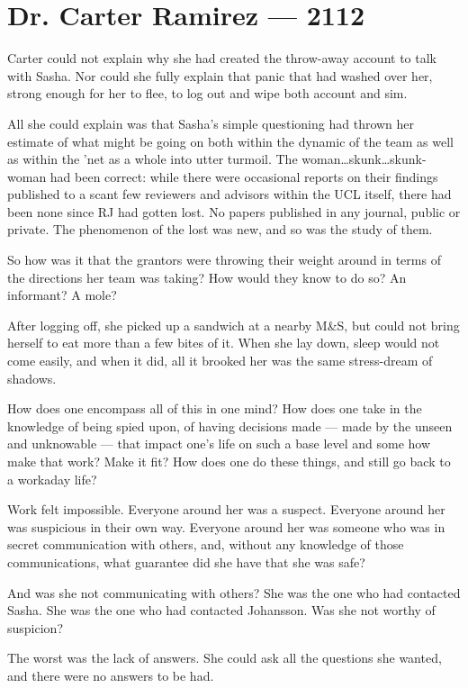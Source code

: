 \hypertarget{dr-carter-ramirez-2112}{%
\chapter*{Dr. Carter Ramirez — 2112}\label{dr-carter-ramirez-2112}}

Carter could not explain why she had created the throw-away account to talk with Sasha. Nor could she fully explain that panic that had washed over her, strong enough for her to flee, to log out and wipe both account and sim.

All she could explain was that Sasha's simple questioning had thrown her estimate of what might be going on both within the dynamic of the team as well as within the 'net as a whole into utter turmoil. The woman\ldots{}skunk\ldots{}skunk-woman had been correct: while there were occasional reports on their findings published to a scant few reviewers and advisors within the UCL itself, there had been none since RJ had gotten lost. No papers published in any journal, public or private. The phenomenon of the lost was new, and so was the study of them.

So how was it that the grantors were throwing their weight around in terms of the directions her team was taking? How would they know to do so? An informant? A mole?

After logging off, she picked up a sandwich at a nearby M\&S, but could not bring herself to eat more than a few bites of it. When she lay down, sleep would not come easily, and when it did, all it brooked her was the same stress-dream of shadows.\pagebreak

How does one encompass all of this in one mind? How does one take in the knowledge of being spied upon, of having decisions made — made by the unseen and unknowable — that impact one's life on such a base level and some how make that work? Make it fit? How does one do these things, and still go back to a workaday life?

Work felt impossible. Everyone around her was a suspect. Everyone around her was suspicious in their own way. Everyone around her was someone who was in secret communication with others, and, without any knowledge of those communications, what guarantee did she have that she was safe?

And was she not communicating with others? She was the one who had contacted Sasha. She was the one who had contacted Johansson. Was she not worthy of suspicion?

The worst was the lack of answers. She could ask all the questions she wanted, and there were no answers to be had.

